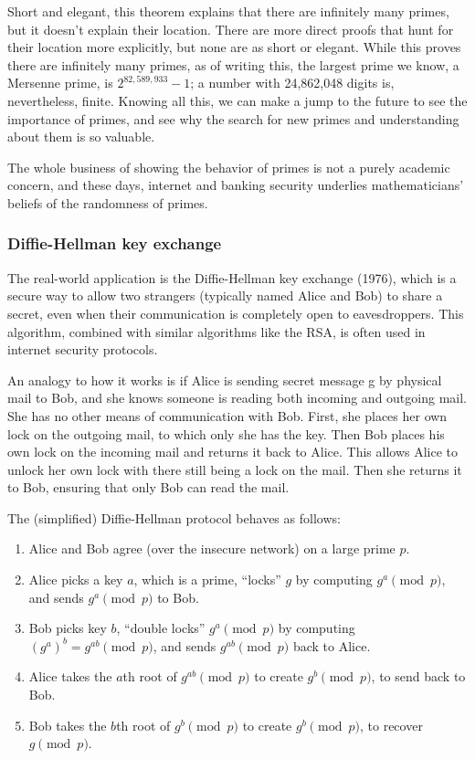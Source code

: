 Short and elegant, this theorem explains that there are infinitely many primes, but it doesn’t explain their location. There are more direct proofs that hunt for their location more explicitly, but none are as short or elegant. While this proves there are infinitely many primes, as of writing this, the largest prime we know, a Mersenne prime, is \(2^{82,589,933} - 1\); a number with 24,862,048 digits is, nevertheless, finite. Knowing all this, we can make a jump to the future to see the importance of primes, and see why the search for new primes and understanding about them is so valuable.

The whole business of showing the behavior of primes is not a purely academic concern, and these days, internet and banking security underlies mathematicians’ beliefs of the randomness of primes.  

\subsubsection*{Diffie-Hellman key exchange}

The real-world application is the Diffie-Hellman key exchange (1976), which is a secure way to allow two strangers (typically named Alice and Bob) to share a secret, even when their communication is completely open to eavesdroppers. This algorithm, combined with similar algorithms like the RSA, is often used in internet security protocols. 

An analogy to how it works is if Alice is sending secret message g by physical mail to Bob, and she knows someone is reading both incoming and outgoing mail. She has no other means of communication with Bob. First, she places her own lock on the outgoing mail, to which only she has the key. Then Bob places his own lock on the incoming mail and returns it back to Alice. This allows Alice to unlock her own lock with there still being a lock on the mail. Then she returns it to Bob, ensuring that only Bob can read the mail.  

The (simplified) Diffie-Hellman protocol behaves as follows:

\begin{enumerate}
    \item Alice and Bob agree (over the insecure network) on a large prime \(p\).
    \item Alice picks a key \(a\), which is a prime, “locks” \(g\) by computing \(g^a \pmod{p} \), and sends \(g^a \pmod{p} \) to Bob.
    \item Bob picks key \(b\), “double locks” \(g^a \pmod{p}\) by computing \({(g^a)}^b = g^{ab} \pmod{p} \), and sends \(g^{ab} \pmod{p} \) back to Alice.
    \item Alice takes the \(a\)th root of \(g^{ab} \pmod{p} \) to create \(g^b \pmod{p} \), to send back to Bob.
    \item Bob takes the \(b\)th root of \(g^b \pmod{p} \) to create \(g^b \pmod{p}\), to recover \(g \pmod{p}\).
\end{enumerate} 

